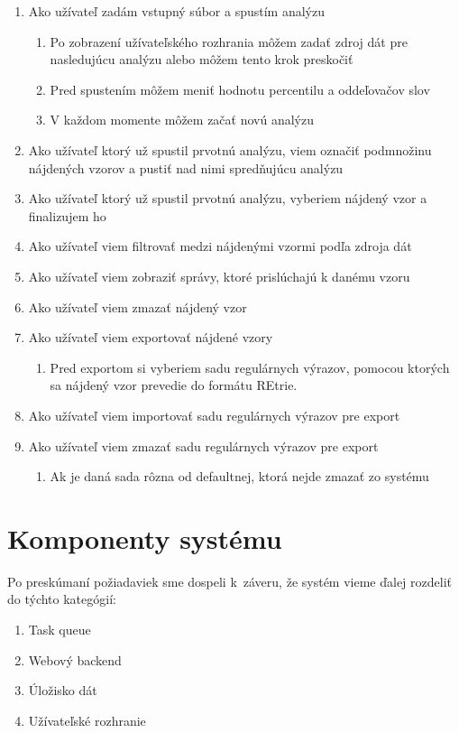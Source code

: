 \begin{enumerate}
  \item Ako užívateľ zadám vstupný súbor a spustím analýzu
  \begin{enumerate}
  	\item Po zobrazení užívateľského rozhrania môžem zadať zdroj dát pre nasledujúcu analýzu alebo môžem tento krok preskočiť
  	\item Pred spustením môžem meniť hodnotu percentilu a oddeľovačov slov
  	\item V každom momente môžem začať novú analýzu
  \end{enumerate}
  \item Ako užívateľ ktorý už spustil prvotnú analýzu, viem označiť podmnožinu nájdených vzorov a pustiť nad nimi spredňujúcu analýzu
  \item Ako užívateľ ktorý už spustil prvotnú analýzu, vyberiem nájdený vzor a finalizujem ho
  \item Ako užívateľ viem filtrovať medzi nájdenými vzormi podľa zdroja dát
  \item Ako užívateľ viem zobraziť správy, ktoré prislúchajú k danému vzoru
  \item Ako užívateľ viem zmazať nájdený vzor
  \item Ako užívateľ viem exportovať nájdené vzory
  \begin{enumerate}
  	\item Pred exportom si vyberiem sadu regulárnych výrazov, pomocou ktorých sa nájdený vzor prevedie do formátu REtrie.
  \end{enumerate}
  \item Ako užívateľ viem importovať sadu regulárnych výrazov pre export
  \item Ako užívateľ viem zmazať sadu regulárnych výrazov pre export
  \begin{enumerate}
  	\item Ak je daná sada rôzna od defaultnej, ktorá nejde zmazať zo systému
  \end{enumerate}
\end{enumerate}

\section{Komponenty systému}
Po preskúmaní požiadaviek sme dospeli k~záveru, že systém vieme ďalej rozdeliť do týchto kategógií:

\begin{enumerate}
  \item Task queue
  \item Webový backend
  \item Úložisko dát
  \item Užívateľské rozhranie
\end{enumerate}


